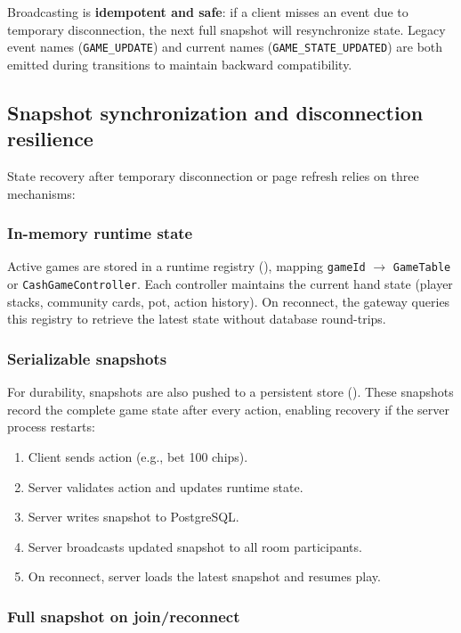 \documentclass[11pt,a4paper]{article}
\begin{document}
Broadcasting is \textbf{idempotent and safe}: if a client misses an event due to temporary disconnection, the next full snapshot will resynchronize state. Legacy event names (\texttt{GAME\_UPDATE}) and current names (\texttt{GAME\_STATE\_UPDATED}) are both emitted during transitions to maintain backward compatibility.

\subsection{Snapshot synchronization and disconnection resilience}

State recovery after temporary disconnection or page refresh relies on three mechanisms:

\subsubsection{In-memory runtime state}

Active games are stored in a runtime registry (), mapping \texttt{gameId} $\to$ \texttt{GameTable} or \texttt{CashGameController}. Each controller maintains the current hand state (player stacks, community cards, pot, action history). On reconnect, the gateway queries this registry to retrieve the latest state without database round-trips.

\subsubsection{Serializable snapshots}

For durability, snapshots are also pushed to a persistent store (). These snapshots record the complete game state after every action, enabling recovery if the server process restarts:

\begin{enumerate}
\item Client sends action (e.g., bet 100 chips).
\item Server validates action and updates runtime state.
\item Server writes snapshot to PostgreSQL.
\item Server broadcasts updated snapshot to all room participants.
\item On reconnect, server loads the latest snapshot and resumes play.
\end{enumerate}

\subsubsection{Full snapshot on join/reconnect}
\end{document}

